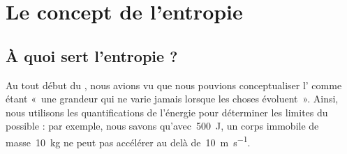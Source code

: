 \section{Le concept de l’entropie}

	\subsection{À quoi sert l’entropie ?}
	
		Au tout début du \coursun, nous avions vu que nous pouvions conceptualiser l’ comme étant «~une grandeur qui ne varie jamais lorsque les choses évoluent~». Ainsi, nous utilisons les quantifications de l’énergie pour déterminer les limites du possible : par exemple, nous savons qu’avec~\SI{500}{\joule}, un corps immobile de masse~\SI{10}{\kilogram} ne peut pas accélérer au delà de~\SI{10}{\metre\per\second}.
	
